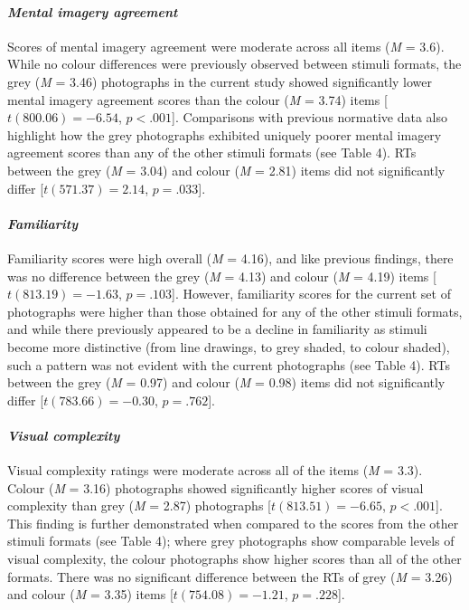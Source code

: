 \documentclass[
  11pt,
]{article}
\begin{document}
\hypertarget{mental-imagery-agreement}{%
\paragraph{\texorpdfstring{\emph{Mental imagery
agreement}}{Mental imagery agreement}}\label{mental-imagery-agreement}}

Scores of mental imagery agreement were moderate across all items
(\emph{M} = 3.6). While no colour differences were previously observed
between stimuli formats, the grey (\emph{M} = 3.46) photographs in the
current study showed significantly lower mental imagery agreement scores
than the colour (\emph{M} = 3.74) items {[}\(t(800.06) = -6.54\),
\(p < .001\){]}. Comparisons with previous normative data also highlight
how the grey photographs exhibited uniquely poorer mental imagery
agreement scores than any of the other stimuli formats (see Table 4).
RTs between the grey (\emph{M} = 3.04) and colour (\emph{M} = 2.81)
items did not significantly differ {[}\(t(571.37) = 2.14\),
\(p = .033\){]}.

\hypertarget{familiarity}{%
\paragraph{\texorpdfstring{\emph{Familiarity}}{Familiarity}}\label{familiarity}}

Familiarity scores were high overall (\emph{M} = 4.16), and like
previous findings, there was no difference between the grey (\emph{M} =
4.13) and colour (\emph{M} = 4.19) items {[}\(t(813.19) = -1.63\),
\(p = .103\){]}. However, familiarity scores for the current set of
photographs were higher than those obtained for any of the other stimuli
formats, and while there previously appeared to be a decline in
familiarity as stimuli become more distinctive (from line drawings, to
grey shaded, to colour shaded), such a pattern was not evident with the
current photographs (see Table 4). RTs between the grey (\emph{M} =
0.97) and colour (\emph{M} = 0.98) items did not significantly differ
{[}\(t(783.66) = -0.30\), \(p = .762\){]}.

\hypertarget{visual-complexity}{%
\paragraph{\texorpdfstring{\emph{Visual
complexity}}{Visual complexity}}\label{visual-complexity}}

Visual complexity ratings were moderate across all of the items
(\emph{M} = 3.3). Colour (\emph{M} = 3.16) photographs showed
significantly higher scores of visual complexity than grey (\emph{M} =
2.87) photographs {[}\(t(813.51) = -6.65\), \(p < .001\){]}. This
finding is further demonstrated when compared to the scores from the
other stimuli formats (see Table 4); where grey photographs show
comparable levels of visual complexity, the colour photographs show
higher scores than all of the other formats. There was no significant
difference between the RTs of grey (\emph{M} = 3.26) and colour
(\emph{M} = 3.35) items {[}\(t(754.08) = -1.21\), \(p = .228\){]}.
\end{document}
